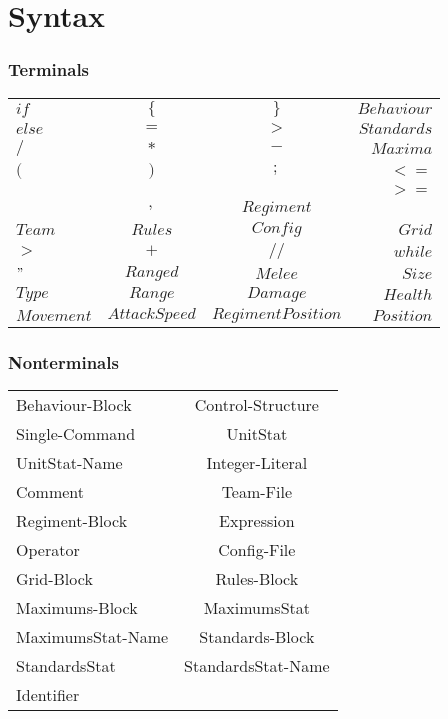 \section{Syntax}
	\subsubsection{Terminals}
		\begin{tabular}{ l c c r}
			$if  	 $	& $\{ 	 $		&$ \} 	  $				&$ Behaviour$  \\
		  	$else	 $	&$ = 	$		&$ >  	  $				&$ Standards$  \\
		 	$/ 		 $	&$ *  	 $		&$ -  	  $				&$ Maxima$	  \\
		 	$( 		 $	&$ )  	 $		&$ ;  	  $				&$ < =$		  \\
			 			&				&						&$ > =$	    \\
		 				&$ ,      $		&$ Regiment$			&  \\
			$Team	 $	&$ Rules   $	&$ Config   $			&$ Grid$	   \\
			$>		 $	&$   + 	 $		&$ //	 	  $			&$ while $   \\
			$ "		 $	&$ Ranged  $	&$   Melee  $			&$ Size	$	\\
			$ Type	 $	&$ Range  $		&$   Damage  $			&$ Health	$	\\		
			$ Movement $&$ AttackSpeed $&$   RegimentPosition  $&$ Position	$	\\	
		\end{tabular}
	\subsubsection{Nonterminals}
		\begin{tabular}{l c}
			Behaviour-Block   & Control-Structure   \\
			Single-Command    & UnitStat 			\\
			UnitStat-Name	  & Integer-Literal		\\
			Comment			  & Team-File 			\\
			Regiment-Block	  & Expression			\\
			Operator		  & Config-File			\\
			Grid-Block	      & Rules-Block 		\\
			Maximums-Block	  & MaximumsStat		\\
			MaximumsStat-Name & Standards-Block	 	\\
			StandardsStat	  & StandardsStat-Name 	\\
			Identifier		  & 					\\
		\end{tabular}
	
